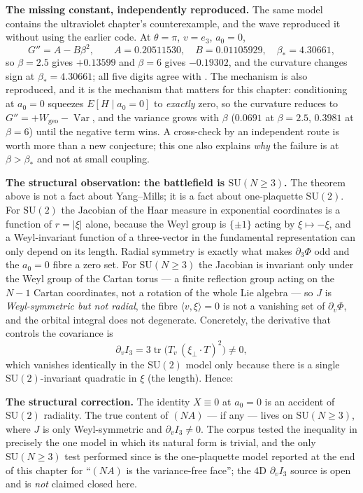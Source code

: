 \textbf{The missing constant, independently reproduced.} The same model contains the ultraviolet
chapter's counterexample, and the wave reproduced it without using the earlier code. At
$\theta=\pi$, $v=e_3$, $a_0=0$,
\begin{equation}
  G''=A-B\beta^2,\qquad A=0.20511530,\quad B=0.01105929,\quad \beta_*=4.30661,
  \label{eq:nacounter}
\end{equation}
so $\beta=2.5$ gives $+0.13599$ and $\beta=6$ gives $-0.19302$, and the curvature changes sign at
$\beta_*=4.30661$; all five digits agree with  \LE. The mechanism
is also reproduced, and it is the mechanism that matters for this chapter: conditioning at $a_0=0$
squeezes $E[H\mid a_0=0]$ to \emph{exactly} zero, so the curvature reduces to
$G''=+W_{\mathrm{geo}}-\operatorname{Var}$, and the variance grows with $\beta$ ($0.0691$ at
$\beta=2.5$, $0.3981$ at $\beta=6$) until the negative term wins. A cross-check by an independent
route is worth more than a new conjecture; this one also explains \emph{why} the failure is at
$\beta>\beta_*$ and not at small coupling.

\textbf{The structural observation: the battlefield is $\mathrm{SU}(N\ge3)$.} The theorem above is
not a fact about Yang--Mills; it is a fact about one-plaquette $\mathrm{SU}(2)$. For $\mathrm{SU}(2)$
the Jacobian of the Haar measure in exponential coordinates is a function of $r=\lvert\xi\rvert$
alone, because the Weyl group is $\{\pm1\}$ acting by $\xi\mapsto-\xi$, and a Weyl-invariant
function of a three-vector in the fundamental representation can only depend on its length. Radial
symmetry is exactly what makes $\partial_3\Phi$ odd and the $a_0=0$ fibre a zero set. For
$\mathrm{SU}(N\ge3)$ the Jacobian is invariant only under the Weyl group of the Cartan torus --- a
finite reflection group acting on the $N-1$ Cartan coordinates, not a rotation of the whole Lie
algebra --- so $J$ is \emph{Weyl-symmetric but not radial}, the fibre $\langle v,\xi\rangle=0$ is not
a vanishing set of $\partial_v\Phi$, and the orbital integral does not degenerate. Concretely, the
derivative that controls the covariance is
\begin{equation}
  \partial_v I_3=3\operatorname{tr}\bigl(T_v\,(\xi_\perp\!\cdot T)^2\bigr)\neq0 ,
  \label{eq:nasun}
\end{equation}
which vanishes identically in the $\mathrm{SU}(2)$ model only because there is a single
$\mathrm{SU}(2)$-invariant quadratic in $\xi$ (the length). Hence:
\begin{qbox}
\textbf{The structural correction.} The identity $X\equiv0$ at $a_0=0$ is an accident of
$\mathrm{SU}(2)$ radiality. The true content of $(NA)$ --- if any --- lives on
$\mathrm{SU}(N\ge3)$, where $J$ is only Weyl-symmetric and $\partial_vI_3\neq0$. The corpus tested
the inequality in precisely the one model in which its natural form is trivial, and the only
$\mathrm{SU}(N\ge3)$ test performed since is the one-plaquette model reported at the end of this
chapter \LN{} for ``$(NA)$ is the variance-free face''; the $4$D $\partial_vI_3$ source is open and is
\emph{not} claimed closed here.
\end{qbox}

